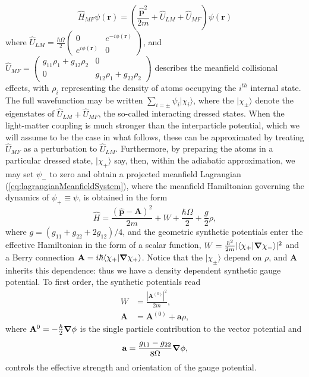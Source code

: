 \documentclass[twocolumn, nofootinbib, nobibnotes, amsmath,amssymb,aps, pra, floatfix]{revtex4-1}
\renewcommand{\v}[1]{\ensuremath{\mathbf{#1}}} %
\newcommand{\gv}[1]{\ensuremath{\mbox{\boldmath$ #1 $}}} %
\newcommand{\abs}[1]{\left| #1 \right|} %
\newcommand{\grad}[1]{\gv{\nabla} #1} %
\begin{document}
\begin{equation}
  \hat{H}_{MF}\psi\left( \v{r} \right)=\left(\frac{\hat{\v{p}}^2}{2m}+\hat{U}_{LM}+\hat{U}_{MF} \right)\psi\left( \v{r} \right)
\end{equation}
where $\hat{U}_{LM}= 
\frac{\hbar\Omega}{2}\left(\begin{array}{cc}
  0 & e^{-i\phi(\v{r})} \\
  e^{i\phi(\v{r})} & 0 \end{array} \right)$, and
$\hat{U}_{MF}=\left(\begin{array}{cc}
g_{11}\rho_1+g_{12}\rho_2 & 0 \\
0 & g_{12}\rho_1+g_{22}\rho_2 \end{array} \right)
$ describes the meanfield collisional effects, with $\rho_i$ representing the density of atoms occupying the $i^{th}$ internal state.
The full wavefunction may be written $\sum_{i=\pm}\psi_i|\chi_i\rangle$, where the $|\chi_{\pm}\rangle$ denote the eigenstates of $\hat{U}_{LM}+\hat{U}_{MF}$, the so-called interacting dressed states.
When the light-matter coupling is much stronger than the interparticle potential, which we will assume to be the case in what follows, these can be approximated by treating $\hat{U}_{MF}$ as a perturbation to $\hat{U}_{LM}$.
Furthermore, by preparing the atoms in a particular dressed state, $|\chi_+\rangle$ say, then, within the adiabatic approximation, we may set $\psi_-$ to zero and obtain a projected meanfield Lagrangian (\ref{eq:lagrangianMeanfieldSystem}), where the meanfield Hamiltonian governing the dynamics of $\psi_+\equiv\psi$, is obtained in the form 
\begin{equation}
  \hat{H}=\frac{\left( \hat{\v{p}}-\v{A} \right)^2}{2m}+W+\frac{\hbar\Omega}{2}+\frac{g}{2}\rho,
  \label{eq:meanfieldHamiltonianProjectedNonlinearGaugePotential}
\end{equation}
where $g=\left( g_{11}+g_{22}+2g_{12} \right)/4$, and the geometric synthetic potentials enter the effective Hamiltonian in the form of a scalar function, $W=\frac{\hbar^2}{2m}|\langle\chi_+|\grad{} \chi_- \rangle|^2$ and a Berry connection $\v{A}=i\hbar\langle\chi_+|\grad{}\chi_+\rangle$.
Notice that the $|\chi_{\pm}\rangle$ depend on $\rho$, and $\v{A}$ inherits this dependence: thus we have a density dependent synthetic gauge potential.
To first order, the synthetic potentials read
\begin{align}
  W&=\frac{\abs{\v{A}^{(0)}}^2}{2m}, \\
  \v{A}&=\v{A}^{\left( 0 \right)}+\v{a}\rho,
  \label{}
\end{align}
where $\v{A}^{0}=-\frac{\hbar}{2}\grad{\phi}$ is the single particle contribution to the vector potential and 
\begin{equation}
  \v{a}=\frac{g_{11}-g_{22}}{8\Omega} \grad{\phi}, 
  \label{eq:effectiveStrengthSingleComponentGaugePotential} 
\end{equation}
controls the effective strength and orientation of the gauge potential.
\end{document}
